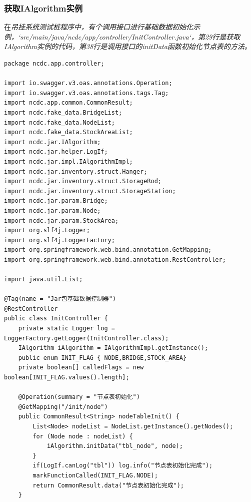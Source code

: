 \subsubsection{获取IAlgorithm实例}
在\it{吊挂系统测试桩}程序中，有个调用接口进行基础数据初始化示例，`src/main/java/ncdc/app/controller/InitController.java`，第29行是获取IAlgorithm实例的代码，第38行是调用接口的initData函数初始化节点表的方法。
\begin{lstlisting}
package ncdc.app.controller;

import io.swagger.v3.oas.annotations.Operation;
import io.swagger.v3.oas.annotations.tags.Tag;
import ncdc.app.common.CommonResult;
import ncdc.fake_data.BridgeList;
import ncdc.fake_data.NodeList;
import ncdc.fake_data.StockAreaList;
import ncdc.jar.IAlgorithm;
import ncdc.jar.helper.LogIf;
import ncdc.jar.impl.IAlgorithmImpl;
import ncdc.jar.inventory.struct.Hanger;
import ncdc.jar.inventory.struct.StorageRod;
import ncdc.jar.inventory.struct.StorageStation;
import ncdc.jar.param.Bridge;
import ncdc.jar.param.Node;
import ncdc.jar.param.StockArea;
import org.slf4j.Logger;
import org.slf4j.LoggerFactory;
import org.springframework.web.bind.annotation.GetMapping;
import org.springframework.web.bind.annotation.RestController;

import java.util.List;

@Tag(name = "Jar包基础数据控制器")
@RestController
public class InitController {
    private static Logger log = LoggerFactory.getLogger(InitController.class);
    IAlgorithm iAlgorithm = IAlgorithmImpl.getInstance();
    public enum INIT_FLAG { NODE,BRIDGE,STOCK_AREA}
    private boolean[] calledFlags = new boolean[INIT_FLAG.values().length];

    @Operation(summary = "节点表初始化")
    @GetMapping("/init/node")
    public CommonResult<String> nodeTableInit() {
        List<Node> nodeList = NodeList.getInstance().getNodes();
        for (Node node : nodeList) {
            iAlgorithm.initData("tbl_node", node);
        }
        if(LogIf.canLog("tbl")) log.info("节点表初始化完成");
        markFunctionCalled(INIT_FLAG.NODE);
        return CommonResult.data("节点表初始化完成");
    }


\end{lstlisting}

